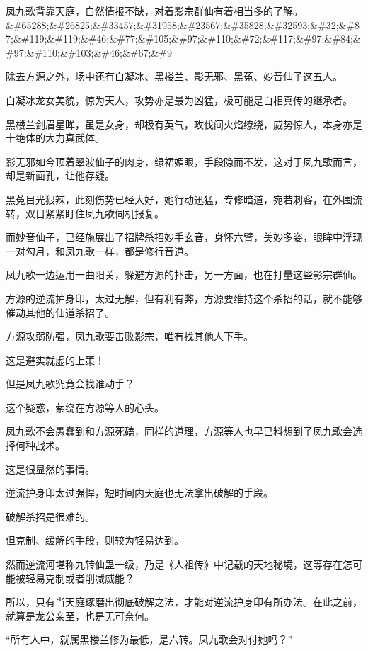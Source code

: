 
\begin{this_body}

凤九歌背靠天庭，自然情报不缺，对着影宗群仙有着相当多的了解。\&\#65288;\&\#26825;\&\#33457;\&\#31958;\&\#23567;\&\#35828;\&\#32593;\&\#32;\&\#87;\&\#119;\&\#119;\&\#46;\&\#77;\&\#105;\&\#97;\&\#110;\&\#72;\&\#117;\&\#97;\&\#84;\&\#97;\&\#110;\&\#103;\&\#46;\&\#67;\&\#9

除去方源之外，场中还有白凝冰、黑楼兰、影无邪、黑菟、妙音仙子这五人。

白凝冰龙女美貌，惊为天人，攻势亦是最为凶猛，极可能是白相真传的继承者。

黑楼兰剑眉星眸，虽是女身，却极有英气，攻伐间火焰缭绕，威势惊人，本身亦是十绝体的大力真武体。

影无邪如今顶着翠波仙子的肉身，绿裙媚眼，手段隐而不发，这对于凤九歌而言，却是新面孔，让他存疑。

黑菟目光狠辣，此刻伤势已经大好，她行动迅猛，专修暗道，宛若刺客，在外围流转，双目紧紧盯住凤九歌伺机报复。

而妙音仙子，已经施展出了招牌杀招妙手玄音，身怀六臂，美妙多姿，眼眸中浮现一对勾月，和凤九歌一样，都是修行音道。

凤九歌一边运用一曲阳关，躲避方源的扑击，另一方面，也在打量这些影宗群仙。

方源的逆流护身印，太过无解，但有利有弊，方源要维持这个杀招的话，就不能够催动其他的仙道杀招了。

方源攻弱防强，凤九歌要击败影宗，唯有找其他人下手。

这是避实就虚的上策！

但是凤九歌究竟会找谁动手？

这个疑惑，萦绕在方源等人的心头。

凤九歌不会愚蠢到和方源死磕，同样的道理，方源等人也早已料想到了凤九歌会选择何种战术。

这是很显然的事情。

逆流护身印太过强悍，短时间内天庭也无法拿出破解的手段。

破解杀招是很难的。

但克制、缓解的手段，则较为轻易达到。

然而逆流河堪称九转仙蛊一级，乃是《人祖传》中记载的天地秘境，这等存在怎可能被轻易克制或者削减威能？

所以，只有当天庭琢磨出彻底破解之法，才能对逆流护身印有所办法。在此之前，就算是龙公亲至，也是无可奈何。

“所有人中，就属黑楼兰修为最低，是六转。凤九歌会对付她吗？”


\end{this_body}
